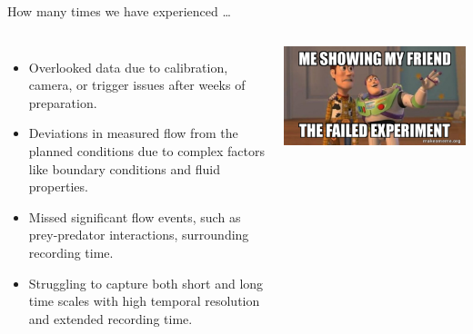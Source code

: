 \begin{frame}[label=why-3a]{How many times we have experienced \ldots }
\begin{columns}

\begin{itemize}
\item Overlooked data due to calibration, camera, or trigger issues after weeks of preparation.
\item Deviations in measured flow from the planned conditions due to complex factors like boundary conditions and fluid properties.
\item Missed significant flow events, such as prey-predator interactions, surrounding recording time.
\item Struggling to capture both short and long time scales with high temporal resolution and extended recording time.
\end{itemize}
\includegraphics[width=\textwidth]{fig/me-showing.jpg}
\end{columns}
\end{frame}




